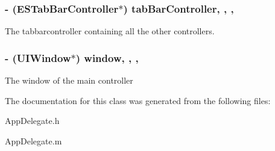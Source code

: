 \subsubsection[{tab\+Bar\+Controller}]{\setlength{\rightskip}{0pt plus 5cm}-\/ ({\bf E\+S\+Tab\+Bar\+Controller}$\ast$) tab\+Bar\+Controller\hspace{0.3cm}{\ttfamily [read]}, {\ttfamily [write]}, {\ttfamily [nonatomic]}, {\ttfamily [strong]}}\label{interface_app_delegate_aceb81bd51dcec8876bf7794fe8aba74f}
The tabbarcontroller containing all the other controllers. \hypertarget{interface_app_delegate_acf48ac24125e688cac1a85445cd7fac2}{}
\subsubsection[{window}]{\setlength{\rightskip}{0pt plus 5cm}-\/ (U\+I\+Window$\ast$) window\hspace{0.3cm}{\ttfamily [read]}, {\ttfamily [write]}, {\ttfamily [nonatomic]}, {\ttfamily [strong]}}\label{interface_app_delegate_acf48ac24125e688cac1a85445cd7fac2}
The window of the main controller 

The documentation for this class was generated from the following files\+:\begin{DoxyCompactItemize}
\item 
App\+Delegate.\+h\item 
App\+Delegate.\+m\end{DoxyCompactItemize}
